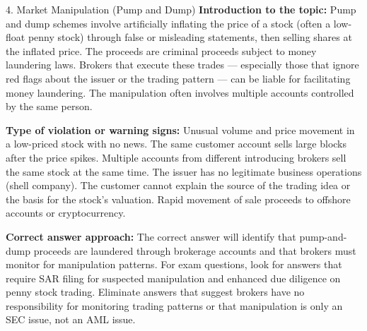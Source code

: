 \documentclass[11pt,a4paper]{beamer}
\begin{document}
\begin{frame}{4. Market Manipulation (Pump and Dump)}
\tiny
\noindent\textbf{Introduction to the topic:} Pump and dump schemes involve artificially inflating the price of a stock (often a low-float penny stock) through false or misleading statements, then selling shares at the inflated price. The proceeds are criminal proceeds subject to money laundering laws. Brokers that execute these trades — especially those that ignore red flags about the issuer or the trading pattern — can be liable for facilitating money laundering. The manipulation often involves multiple accounts controlled by the same person.

\vspace{0.1cm}
\noindent\textbf{Type of violation or warning signs:} Unusual volume and price movement in a low-priced stock with no news. The same customer account sells large blocks after the price spikes. Multiple accounts from different introducing brokers sell the same stock at the same time. The issuer has no legitimate business operations (shell company). The customer cannot explain the source of the trading idea or the basis for the stock's valuation. Rapid movement of sale proceeds to offshore accounts or cryptocurrency.

\vspace{0.1cm}
\noindent\textbf{Correct answer approach:} The correct answer will identify that pump-and-dump proceeds are laundered through brokerage accounts and that brokers must monitor for manipulation patterns. For exam questions, look for answers that require SAR filing for suspected manipulation and enhanced due diligence on penny stock trading. Eliminate answers that suggest brokers have no responsibility for monitoring trading patterns or that manipulation is only an SEC issue, not an AML issue.
\end{frame}
\end{document}
